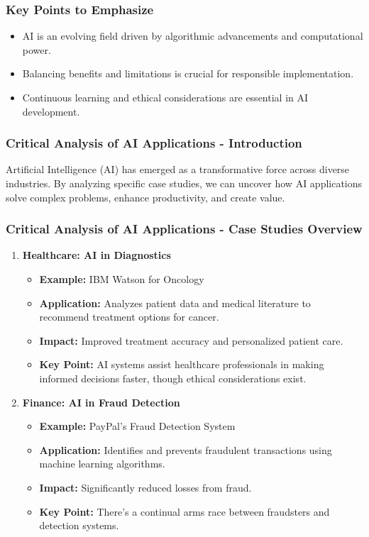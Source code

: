\documentclass{beamer}
\begin{document}
\begin{frame}[fragile]
    \frametitle{Key Points to Emphasize}
    \begin{itemize}
        \item AI is an evolving field driven by algorithmic advancements and computational power.
        \item Balancing benefits and limitations is crucial for responsible implementation.
        \item Continuous learning and ethical considerations are essential in AI development.
    \end{itemize}
\end{frame}

\begin{frame}[fragile]
    \frametitle{Critical Analysis of AI Applications - Introduction}
    Artificial Intelligence (AI) has emerged as a transformative force across diverse industries. By analyzing specific case studies, we can uncover how AI applications solve complex problems, enhance productivity, and create value. 
\end{frame}

\begin{frame}[fragile]
    \frametitle{Critical Analysis of AI Applications - Case Studies Overview}
    \begin{enumerate}
        \item \textbf{Healthcare: AI in Diagnostics}
            \begin{itemize}
                \item \textbf{Example:} IBM Watson for Oncology
                \item \textbf{Application:} Analyzes patient data and medical literature to recommend treatment options for cancer.
                \item \textbf{Impact:} Improved treatment accuracy and personalized patient care.
                \item \textbf{Key Point:} AI systems assist healthcare professionals in making informed decisions faster, though ethical considerations exist.
            \end{itemize}
        
        \item \textbf{Finance: AI in Fraud Detection}
            \begin{itemize}
                \item \textbf{Example:} PayPal's Fraud Detection System
                \item \textbf{Application:} Identifies and prevents fraudulent transactions using machine learning algorithms.
                \item \textbf{Impact:} Significantly reduced losses from fraud.
                \item \textbf{Key Point:} There's a continual arms race between fraudsters and detection systems.
            \end{itemize}
    \end{enumerate}
\end{frame}
\end{document}

